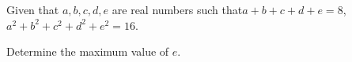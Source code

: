 Given that $a,b,c,d,e$ are real numbers such that$a+b+c+d+e=8$, $a^2+b^2+c^2+d^2+e^2=16$.

Determine the maximum value of $e$.